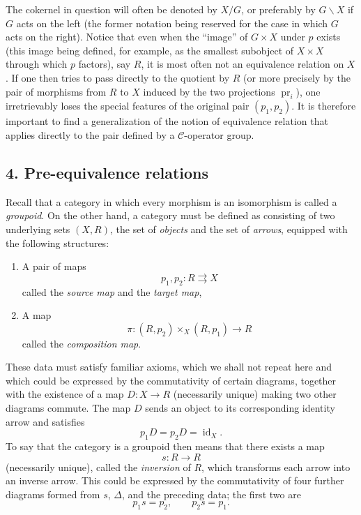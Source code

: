 The cokernel in question will often be denoted by $X/G$, or preferably by
$G\backslash X$ if $G$ acts on the left (the former notation being reserved
for the case in which $G$ acts on the right). Notice that even when the
``image'' of $G\times X$ under $p$ exists (this image being defined, for
example, as the smallest subobject of $X\times X$ through which $p$ factors),
say $R$, it is most often not an equivalence relation on $X$. If one then
tries to pass directly to the quotient by $R$ (or more precisely by the pair
of morphisms from $R$ to $X$ induced by the two projections
$\operatorname{pr}_i$), one irretrievably loses the special features of the
original pair $(p_1,p_2)$. It is therefore important to find a generalization
of the notion of equivalence relation that applies directly to the pair
defined by a $\mathcal C$-operator group.

\subsection*{4. Pre-equivalence relations}

Recall that a category in which every morphism is an isomorphism is called a
\emph{groupoid}. On the other hand, a category must be defined as consisting
of two underlying sets $(X,R)$, the set of \emph{objects} and the set of
\emph{arrows}, equipped with the following structures:
\begin{enumerate}
\item[(i)] A pair of maps
\[
  p_1,p_2:R\rightrightarrows X
\]
called the \emph{source map} and the \emph{target map},

\item[(ii)] A map
\[
  \pi:(R,p_2)\times_X(R,p_1)\longrightarrow R
\]
called the \emph{composition map}.
\end{enumerate}
These data must satisfy familiar axioms, which we shall not repeat here and
which could be expressed by the commutativity of certain diagrams, together
with the existence of a map $D:X\to R$ (necessarily unique) making two other
diagrams commute. The map $D$ sends an object to its corresponding identity
arrow and satisfies
\[
  p_1D=p_2D=\operatorname{id}_X.
\]
To say that the category is a groupoid then means that there exists a map
\[
  s:R\longrightarrow R
\]
(necessarily unique), called the \emph{inversion} of $R$, which transforms
each arrow into an inverse arrow. This could be expressed by the commutativity
of four further diagrams formed from $s$, $\Delta$, and the preceding data;
the first two are
\[
  p_1s=p_2,\qquad p_2s=p_1.
\]

